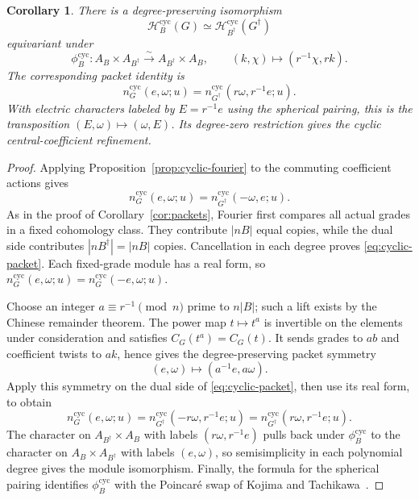 \documentclass[11pt,a4paper,reqno]{amsart}
\theoremstyle{plain}
\newtheorem{corollary}[theorem]{Corollary}
\theoremstyle{definition}
\theoremstyle{remark}
\numberwithin{equation}{section}
\newcommand{\cH}{\mathcal H}
\begin{document}
\begin{corollary}\label{cor:cyclic-packets} There is a degree-preserving isomorphism
\[
\cH_B^{\mathrm{cyc}}(G)\simeq
\cH_{B^\dagger}^{\mathrm{cyc}}(G^\dagger)
\]
equivariant under
\[
\phi_B^{\mathrm{cyc}}\colon A_B\times A_{B^\dagger}\xrightarrow{\sim}
A_{B^\dagger}\times A_B,\qquad
(k,\chi)\longmapsto(r^{-1}\chi,rk).
\]
The corresponding packet identity is
\begin{equation}\label{eq:cyclic-PDpackets}
n_G^{\mathrm{cyc}}(e,\omega;u)=
n_{G^\dagger}^{\mathrm{cyc}}(r\omega,r^{-1}e;u).
\end{equation}
With electric characters labeled by $E=r^{-1}e$ using the spherical pairing, this is the transposition $(E,\omega)\mapsto(\omega,E)$. Its degree-zero restriction gives the cyclic central-coefficient refinement.
\end{corollary}
\begin{proof}
Applying Proposition~\ref{prop:cyclic-fourier} to the commuting coefficient actions gives
\begin{equation}\label{eq:cyclic-packet}
n_G^{\mathrm{cyc}}(e,\omega;u)=n_{G^\dagger}^{\mathrm{cyc}}(-\omega,e;u).
\end{equation}
As in the proof of Corollary~\ref{cor:packets}, Fourier first compares all actual grades in a fixed cohomology class. They contribute $|nB|$ equal copies, while the dual side contributes $|nB^\dagger|=|nB|$ copies. Cancellation in each degree proves \eqref{eq:cyclic-packet}. Each fixed-grade module has a real form, so $n_G^{\mathrm{cyc}}(e,\omega;u)=n_G^{\mathrm{cyc}}(-e,\omega;u)$.

Choose an integer $a\equiv r^{-1}\pmod n$ prime to $n|B|$; such a lift exists by the Chinese remainder theorem. The power map $t\mapsto t^a$ is invertible on the elements under consideration and satisfies $C_G(t^a)=C_G(t)$. It sends grades to $ab$ and coefficient twists to $ak$, hence gives the degree-preserving packet symmetry
\[
(e,\omega)\longmapsto(a^{-1}e,a\omega).
\]
Apply this symmetry on the dual side of \eqref{eq:cyclic-packet}, then use its real form, to obtain
\[
n_G^{\mathrm{cyc}}(e,\omega;u)
=n_{G^\dagger}^{\mathrm{cyc}}(-r\omega,r^{-1}e;u)
=n_{G^\dagger}^{\mathrm{cyc}}(r\omega,r^{-1}e;u).
\]
The character on $A_{B^\dagger}\times A_B$ with labels $(r\omega,r^{-1}e)$ pulls back under $\phi_B^{\mathrm{cyc}}$ to the character on $A_B\times A_{B^\dagger}$ with labels $(e,\omega)$, so semisimplicity in each polynomial degree gives the module isomorphism. Finally, the formula for the spherical pairing identifies $\phi_B^{\mathrm{cyc}}$ with the Poincar\'e swap of Kojima and Tachikawa~\cite[Definition~1.8]{kojima-tachikawa}.
\end{proof}

\clearpage
{}
\nocite{Husemoller}


\end{document}
